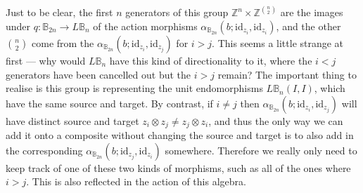 \documentclass{amsbook} %
\numberwithin{section}{chapter}
\begin{document}
Just to be clear, the first $n$ generators of this group $\mathbb{Z}^{n} \times \mathbb{Z}^{{n}\choose{2}}$ are the images under $q: \mathbb{B}_{2n} \to L\mathbb{B}_n$ of the action morphisms $\alpha_{\mathbb{B}_{2n}}(b;\mathrm{id}_{z_i},\mathrm{id}_{z_i})$, and the other ${n}\choose{2}$ come from the $\alpha_{\mathbb{B}_{2n}}(b;\mathrm{id}_{z_i},\mathrm{id}_{z_j})$ for $i > j$. This seems a little strange at first --- why would $L\mathbb{B}_n$ have this kind of directionality to it, where the $i<j$ generators have been cancelled out but the $i > j$ remain? The important thing to realise is this group is representing the unit endomorphisms $L\mathbb{B}_n(I,I)$, which have the same source and target. By contrast, if $i \neq j$ then $\alpha_{\mathbb{B}_{2n}}(b;\mathrm{id}_{z_i},\mathrm{id}_{z_j})$ will have distinct source and target $z_i \otimes z_j \neq z_j \otimes z_i$, and thus the only way we can add it onto a composite without changing the source and target is to also add in the corresponding $\alpha_{\mathbb{B}_{2n}}(b;\mathrm{id}_{z_j},\mathrm{id}_{z_i})$ somewhere. Therefore we really only need to keep track of one of these two kinds of morphisms, such as all of the ones where $i > j$. This is also reflected in the action of this algebra.
\end{document}
